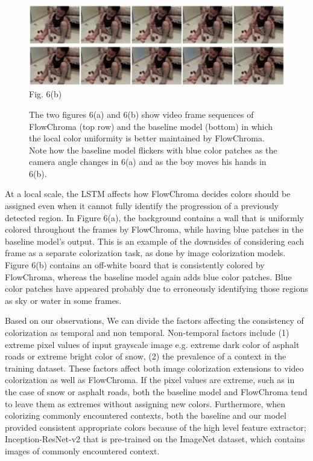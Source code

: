 \documentclass[10pt,twocolumn,letterpaper]{article}
\begin{document}
\begin{figure}[!h]
\includegraphics[width=\textwidth]{fc-dk-playing.png}
\centering
\label{}{\footnotesize Fig. 6(b)}
\caption{The two figures 6(a) and 6(b) show video frame sequences of FlowChroma (top row) and the baseline model (bottom) in which the local color uniformity is better maintained by FlowChroma. Note how the baseline model flickers with blue color patches as the camera angle changes in 6(a) and as the boy moves his hands in 6(b).}
\end{figure}

At a local scale, the LSTM affects how FlowChroma decides colors should be assigned even when it cannot fully identify the progression of a previously detected region. In Figure 6(a), the background contains a wall that is uniformly colored throughout the frames by FlowChroma, while having blue patches in the baseline model's output. This is an example of the downsides of considering each frame as a separate colorization task, as done by image colorization models. Figure 6(b) contains an off-white board that is consistently colored by FlowChroma, whereas the baseline model again adds blue color patches. Blue color patches have appeared probably due to erroneously identifying those regions as sky or water in some frames.

Based on our observations, We can divide the factors affecting the consistency of colorization as temporal and non temporal. Non-temporal factors include (1) extreme pixel values of input grayscale image e.g. extreme dark color of asphalt roads or extreme bright color of snow, (2) the prevalence of a context in the training dataset. These factors affect both image colorization extensions to video colorization as well as FlowChroma. If the pixel values are extreme, such as in the case of snow or asphalt roads, both the baseline model and FlowChroma tend to leave them as extremes without assigning new colors. Furthermore, when colorizing commonly encountered contexts, both the baseline and our model provided consistent appropriate colors because of the high level feature extractor; Inception-ResNet-v2 that is pre-trained on the ImageNet dataset, which contains images of commonly encountered context.
\end{document}
